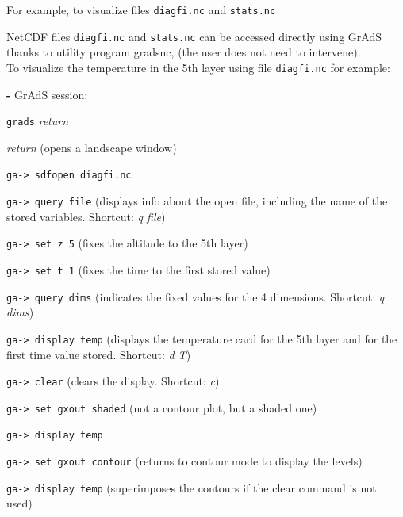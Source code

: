 For example, to visualize files {\tt diagfi.nc} and {\tt stats.nc}

NetCDF files {\tt diagfi.nc} and {\tt stats.nc} can be accessed directly
using GrAdS thanks to utility program gradsnc,
(the user does not need to intervene).\\

\noindent
To visualize the temperature in the 5th layer using file
{\tt diagfi.nc} for example:
\label{loc:visu}

\begin{description}
\item {\bf -} GrAdS session:

  \begin{description}
  \item \verb+grads+ {\it return}

  \item {\it return} (opens a landscape window)

  \item \verb+ga-> sdfopen diagfi.nc+

  \item \verb+ga-> query file+ (displays info about the open file, including the name of the stored variables. Shortcut: {\it q file})

  \item \verb+ga-> set z 5+ (fixes the altitude to the 5th layer)

  \item \verb+ga-> set t 1+ (fixes the time to the first stored value)

  \item \verb+ga-> query dims+ (indicates the fixed values for the 4
  dimensions. Shortcut: {\it q dims})

  \item \verb+ga-> display temp+ (displays the temperature card for the 5th layer and for the first time value stored. Shortcut: {\it d
  T})

  \item \verb+ga-> clear+ (clears the display. Shortcut: {\it c})

  \item \verb+ga-> set gxout shaded+ (not a contour plot, but a shaded one)

  \item \verb+ga-> display temp+

  \item \verb+ga-> set gxout contour+ (returns to contour mode to display the levels)

  \item \verb+ga-> display temp+ (superimposes the contours if the clear command is not used)

  \end{description}
\end{description}



